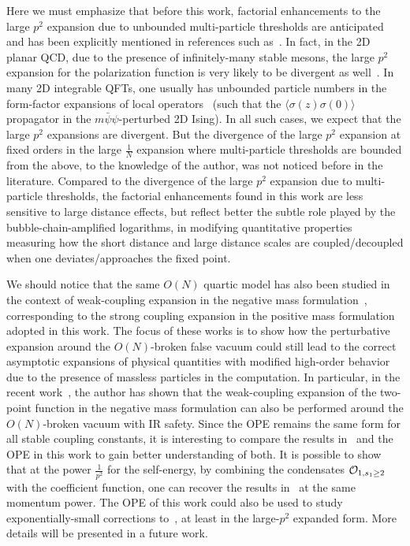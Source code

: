 \documentclass[a4paper,11pt]{article}
\begin{document}
Here we must emphasize that before this work, factorial enhancements to the large $p^2$ expansion due to unbounded multi-particle thresholds are anticipated and has been explicitly mentioned in references such as~\cite{Beneke:1998eq, Marino:2023epd}. In fact, in the 2D planar QCD, due to the presence of infinitely-many stable mesons, the large $p^2$ expansion for the polarization function is very likely to be divergent as well~\cite{Boito:2017cnp,deRafael:2010ac}. In many 2D integrable QFTs, one usually has unbounded particle numbers in the form-factor expansions of local operators~\cite{Smirnov:1992vz} (such that the $\langle\sigma(z)\sigma(0)\rangle$~\cite{Wu:1975mw,Berg:1978sw} propagator in the $m\bar\psi\psi$-perturbed 2D Ising). In all such cases, we expect that the large $p^2$ expansions are divergent. But the divergence of the large $p^2$ expansion at fixed orders in the large $\frac{1}{N}$ expansion where multi-particle thresholds are bounded from the above, to the knowledge of the author, was not noticed before in the literature. Compared to the divergence of the large $p^2$ expansion due to multi-particle thresholds, the factorial enhancements found in this work are less sensitive to large distance effects, but reflect better the subtle role played by the bubble-chain-amplified logarithms, in modifying quantitative properties measuring how the short distance and large distance scales are coupled/decoupled when one deviates/approaches the fixed point.   

We should notice that the same $O(N)$ quartic model has also been studied in the context of weak-coupling expansion in the negative mass formulation~\cite{Marino:2019fvu,Marino:2025ido}, corresponding to the strong coupling expansion in the positive mass formulation adopted in this work. The focus of these works is to show how the perturbative expansion around the $O(N)$-broken false vacuum could still lead to the correct asymptotic expansions of physical quantities with modified high-order behavior due to the presence of massless particles in the computation. In particular, in the recent work~\cite{Marino:2025ido}, the author has shown that the weak-coupling expansion of the two-point function in the negative mass formulation can also be performed around the $O(N)$-broken vacuum with IR safety. Since the OPE remains the same form for all stable coupling constants, it is interesting to compare the results in~\cite{Marino:2025ido} and the OPE in this work to gain better understanding of both. It is possible to show that at the power $\frac{1}{p^2}$ for the self-energy, by combining the condensates ${\cal O}_{1,s_1\ge 2}$ with the coefficient function, one can recover the results in~\cite{Marino:2025ido} at the same momentum power. The OPE of this work could also be used to study exponentially-small corrections to~\cite{Marino:2025ido}, at least in the large-$p^2$ expanded form. More details will be presented in a future work. 
 
\end{document}
